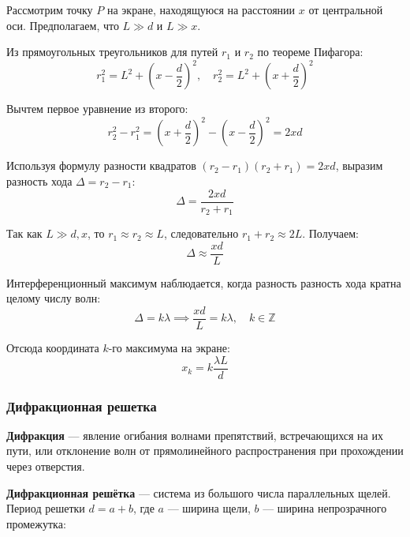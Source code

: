 Рассмотрим точку $P$ на экране, находящуюся на расстоянии $x$ от центральной оси. Предполагаем, что $L \gg d$ и $L \gg x$.

Из прямоугольных треугольников для путей $r_1$ и $r_2$ по теореме Пифагора:
\[
r_1^2 = L^2 + \left(x - \frac{d}{2}\right)^2, \quad r_2^2 = L^2 + \left(x + \frac{d}{2}\right)^2
\]

Вычтем первое уравнение из второго:
\[
r_2^2 - r_1^2 = \left(x + \frac{d}{2}\right)^2 - \left(x - \frac{d}{2}\right)^2 = 2xd
\]

Используя формулу разности квадратов $(r_2 - r_1)(r_2 + r_1) = 2xd$, выразим разность хода $\Delta = r_2 - r_1$:
\[
\Delta = \frac{2xd}{r_2 + r_1}
\]

Так как $L \gg d, x$, то $r_1 \approx r_2 \approx L$, следовательно $r_1 + r_2 \approx 2L$. Получаем:
\[
\Delta \approx \frac{xd}{L}
\]

Интерференционный максимум наблюдается, когда разность разность хода кратна целому числу волн:
\[
\Delta = k\lambda \implies \frac{xd}{L} = k\lambda, \quad k \in\mathbb{Z}
\]

Отсюда координата $k$-го максимума на экране:
\[\boxed{
x_k = k \frac{\lambda L}{d}
}\]

\subsubsection{Дифракционная решетка}

\textbf{Дифракция} --- явление огибания волнами препятствий, встречающихся на их пути, или отклонение волн от прямолинейного распространения при прохождении через отверстия.

\textbf{Дифракционная решётка} --- система из большого числа параллельных щелей.
Период решетки $d = a + b$, где $a$ --- ширина щели, $b$ --- ширина непрозрачного промежутка:

